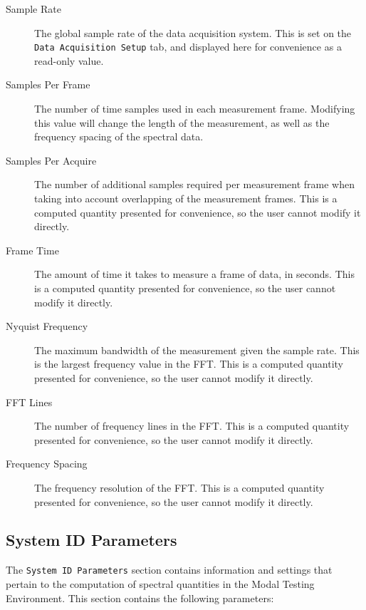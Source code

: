 \documentclass[pdf,12pt,report]{SANDreport}
\newcommand{\inlineCode}{\lstinline[basicstyle=\bfseries\ttfamily]}
\begin{document}
    \begin{description}
        \item[Sample Rate] The global sample rate of the data acquisition system.  This is set on the \inlineCode{Data Acquisition Setup} tab, and displayed here for convenience as a read-only value.
        \item[Samples Per Frame] The number of time samples used in each measurement frame.  Modifying this value will change the length of the measurement, as well as the frequency spacing of the spectral data.
        \item[Samples Per Acquire] The number of additional samples required per measurement frame when taking into account overlapping of the measurement frames.  This is a computed quantity presented for convenience, so the user cannot modify it directly.
        \item[Frame Time] The amount of time it takes to measure a frame of data, in seconds.  This is a computed quantity presented for convenience, so the user cannot modify it directly.
        \item[Nyquist Frequency] The maximum bandwidth of the measurement given the sample rate.  This is the largest frequency value in the \Ac{FFT}.  This is a computed quantity presented for convenience, so the user cannot modify it directly.
        \item[FFT Lines] The number of frequency lines in the \Ac{FFT}.  This is a computed quantity presented for convenience, so the user cannot modify it directly.
        \item[Frequency Spacing] The frequency resolution of the \Ac{FFT}.  This is a computed quantity presented for convenience, so the user cannot modify it directly.
    \end{description}
    
    \subsection{System ID Parameters}
    The \inlineCode{System ID Parameters} section contains information and settings that pertain to the computation of spectral quantities in the Modal Testing Environment.  This section contains the following parameters:
    
\end{document}
